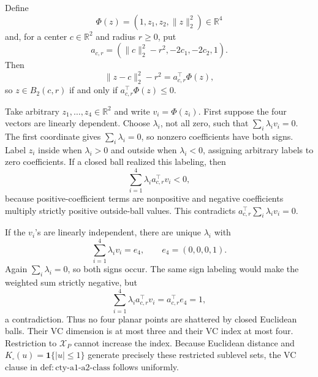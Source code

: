 Define
\[
 \Phi(z)=(1,z_1,z_2,\lVert z\rVert_2^2)\in\mathbb R^4
\]
and, for a center \(c\in\mathbb R^2\) and radius \(r\geq0\), put
\[
 a_{c,r}=(\lVert c\rVert_2^2-r^2,-2c_1,-2c_2,1).
\]
Then
\[
 \lVert z-c\rVert_2^2-r^2=a_{c,r}^{\top}\Phi(z),
\]
so \(z\in B_2(c,r)\) if and only if \(a_{c,r}^{\top}\Phi(z)\leq0\).

Take arbitrary \(z_1,\ldots,z_4\in\mathbb R^2\) and write \(v_i=\Phi(z_i)\).  First suppose the four vectors are linearly dependent.  Choose \(\lambda_i\), not all zero, such that \(\sum_i\lambda_iv_i=0\).  The first coordinate gives \(\sum_i\lambda_i=0\), so nonzero coefficients have both signs.  Label \(z_i\) inside when \(\lambda_i>0\) and outside when \(\lambda_i<0\), assigning arbitrary labels to zero coefficients.  If a closed ball realized this labeling, then
\[
 \sum_{i=1}^4\lambda_i a_{c,r}^{\top}v_i<0,
\]
because positive-coefficient terms are nonpositive and negative coefficients multiply strictly positive outside-ball values.  This contradicts \(a_{c,r}^{\top}\sum_i\lambda_iv_i=0\).

If the \(v_i\)'s are linearly independent, there are unique \(\lambda_i\) with
\[
 \sum_{i=1}^4\lambda_iv_i=e_4,
 \qquad e_4=(0,0,0,1).
\]
Again \(\sum_i\lambda_i=0\), so both signs occur.  The same sign labeling would make the weighted sum strictly negative, but
\[
 \sum_{i=1}^4\lambda_i a_{c,r}^{\top}v_i
 =a_{c,r}^{\top}e_4=1,
\]
a contradiction.  Thus no four planar points are shattered by closed Euclidean balls.  Their VC dimension is at most three and their VC index at most four.  Restriction to \(\mathcal X_P\) cannot increase the index.  Because Euclidean distance and \(K_\square(u)=\mathbf1\{|u|\leq1\}\) generate precisely these restricted sublevel sets, the VC clause in \(\mathrm{def:cty\text{-}a1\text{-}a2\text{-}class}\) follows uniformly.